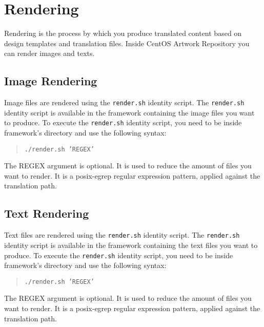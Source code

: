 
\section{Rendering}
\hypertarget{sec:Concepts:Frameworks:Rendering}{}

Rendering is the process by which you produce translated content based
on design templates and translation files. Inside CentOS Artwork
Repository you can render images and texts.

\subsection{Image Rendering}
\hypertarget{sec:Concepts:Frameworks:Rendering:Image}{}

Image files are rendered using the \texttt{render.sh} identity script.
The \texttt{render.sh} identity script is available in the framework
containing the image files you want to produce.  To execute the
\texttt{render.sh} identity script, you need to be inside framework's
directory and use the following syntax:

\begin{quote}
\texttt{./render.sh 'REGEX'}
\end{quote}

The REGEX argument is optional.  It is used to reduce the amount of
files you want to render.  It is a posix-egrep regular expression
pattern, applied against the translation path.

\subsection{Text Rendering}

Text files are rendered using the \texttt{render.sh} identity script.
The \texttt{render.sh} identity script is available in the framework
containing the text files you want to produce.  To execute the
\texttt{render.sh} identity script, you need to be inside framework's
directory and use the following syntax:

\begin{quote}
\texttt{./render.sh 'REGEX'}
\end{quote}

The REGEX argument is optional.  It is used to reduce the amount of
files you want to render.  It is a posix-egrep regular expression
pattern, applied against the translation path.
